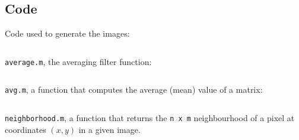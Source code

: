 \subsection{Code}
Code used to generate the images:
\inputminted[linenos=true]{octave}{../code/2.1.m}

\texttt{average.m}, the averaging filter function:
\inputminted[linenos=true]{octave}{../code/avgfilter.m}

\texttt{avg.m}, a function that computes the average (mean) value of a matrix:
\inputminted[linenos=true]{octave}{../code/avg.m}

\texttt{neighborhood.m}, a function that returns the \texttt{n x m} neighbourhood of a pixel at coordinates $(x,y)$ in a given image.
\inputminted[linenos=true]{octave}{../code/neighborhood.m}
